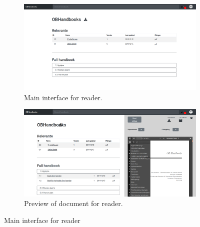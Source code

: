 \begin{figure}[H]
	\centering
	\begin{subfigure}[b]{0.48\textwidth}
		\includegraphics[width=\textwidth]{billeder/iteration3Prototyper/MainRead.png}
		\caption{Main interface for reader.}
		\label{fig:5-MainRead}
	\end{subfigure}
	\quad
	\begin{subfigure}[b]{0.48\textwidth}
		\includegraphics[width=\textwidth]{billeder/iteration3Prototyper/PreviewReader.png}
		\caption{Preview of document for reader.}
		\label{fig:5-PreviewReader}
	\end{subfigure}
	\caption{Main interface for reader}\label{fig:5-MainReader}
\end{figure}

